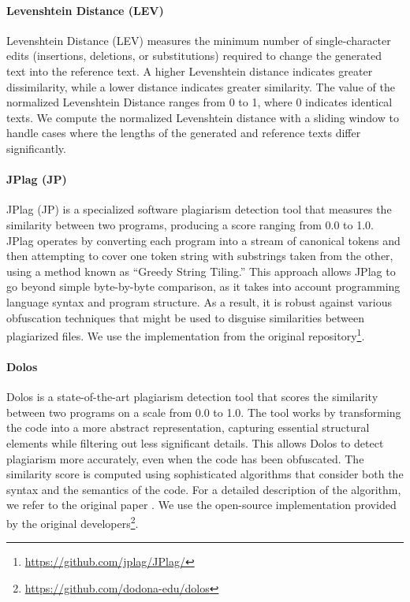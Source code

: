 \paragraph{Levenshtein Distance (LEV)}
Levenshtein Distance (LEV) measures the minimum number of single-character edits (insertions, deletions, or substitutions) required to change the generated text into the reference text. A higher Levenshtein distance indicates greater dissimilarity, while a lower distance indicates greater similarity. The value of the normalized Levenshtein Distance ranges from 0 to 1, where 0 indicates identical texts. We compute the normalized Levenshtein distance with a sliding window to handle cases where the lengths of the generated and reference texts differ significantly.


\paragraph{JPlag (JP)} 
JPlag (JP) \citep{prechelt2002finding} is a specialized software plagiarism detection tool that measures the similarity between two programs, producing a score ranging from 0.0 to 1.0. JPlag operates by converting each program into a stream of canonical tokens and then attempting to cover one token string with substrings taken from the other, using a method known as ``Greedy String Tiling.'' This approach allows JPlag to go beyond simple byte-by-byte comparison, as it takes into account programming language syntax and program structure. As a result, it is robust against various obfuscation techniques that might be used to disguise similarities between plagiarized files. We use the implementation from the original repository\footnote{\href{https://github.com/jplag/JPlag/}{https://github.com/jplag/JPlag/}}.

\paragraph{Dolos} Dolos \citep{maertens2022dolos} is a state-of-the-art plagiarism detection tool that scores the similarity between two programs on a scale from 0.0 to 1.0. The tool works by transforming the code into a more abstract representation, capturing essential structural elements while filtering out less significant details. This allows Dolos to detect plagiarism more accurately, even when the code has been obfuscated. The similarity score is computed using sophisticated algorithms that consider both the syntax and the semantics of the code. For a detailed description of the algorithm, we refer to the original paper \citep{maertens2022dolos}. We use the open-source implementation provided by the original developers\footnote{\href{https://github.com/dodona-edu/dolos}{https://github.com/dodona-edu/dolos}}.


